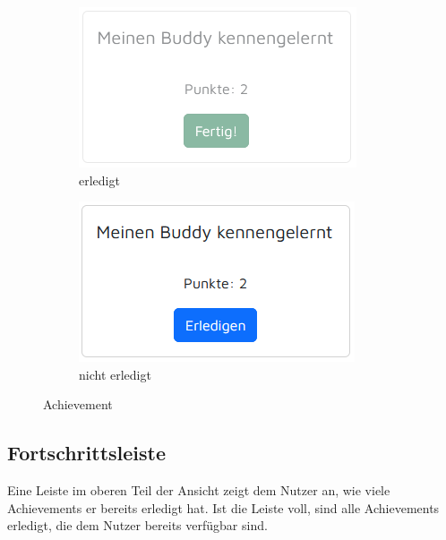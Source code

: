 \documentclass[11pt]{article}
\begin{document}
\begin{figure}[H]
    \centering
    \begin{subfigure}{.4\textwidth}        
        \includegraphics[width=\textwidth]{application/achievement_done.png}
        \caption{erledigt}
    \end{subfigure}
    \hfill
    \begin{subfigure}{.4\textwidth}
        \includegraphics[width=\textwidth]{application/achievement_undone.png}
        \caption{nicht erledigt}
    \end{subfigure}
    \caption{Achievement}
\end{figure}


\subsection{Fortschrittsleiste}
Eine Leiste im oberen Teil der Ansicht zeigt dem Nutzer an, wie viele Achievements er bereits erledigt hat.
Ist die Leiste voll, sind alle Achievements erledigt, die dem Nutzer bereits verfügbar sind. 
\end{document}
